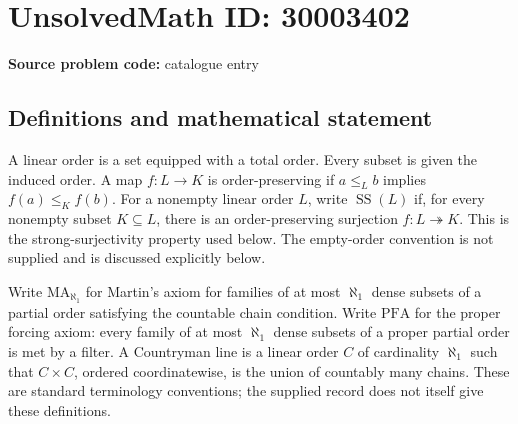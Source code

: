 \documentclass[11pt]{article}
\begin{document}
\section*{UnsolvedMath ID: 30003402}
\textbf{Source problem code:} catalogue entry
\subsection{Definitions and mathematical statement}
A linear order is a set equipped with a total order. Every subset is given the induced order. A map \(f:L\to K\) is order-preserving if \(a\le_L b\) implies \(f(a)\le_K f(b)\). For a nonempty linear order \(L\), write \(\operatorname{SS}(L)\) if, for every nonempty subset \(K\subseteq L\), there is an order-preserving surjection \(f:L\twoheadrightarrow K\). This is the strong-surjectivity property used below. The empty-order convention is not supplied and is discussed explicitly below.

Write \(\mathrm{MA}_{\aleph_1}\) for Martin's axiom for families of at most \(\aleph_1\) dense subsets of a partial order satisfying the countable chain condition. Write \(\mathrm{PFA}\) for the proper forcing axiom: every family of at most \(\aleph_1\) dense subsets of a proper partial order is met by a filter. A Countryman line is a linear order \(C\) of cardinality \(\aleph_1\) such that \(C\times C\), ordered coordinatewise, is the union of countably many chains. These are standard terminology conventions; the supplied record does not itself give these definitions.
\end{document}
